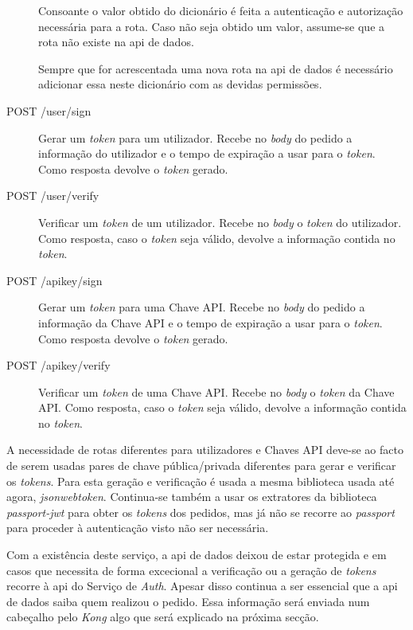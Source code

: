 \begin{description}
        Consoante o valor obtido do dicionário é feita a autenticação e autorização necessária para a rota. Caso não seja obtido um valor, assume-se que a rota não existe na \acrshort{api} de dados.

        Sempre que for acrescentada uma nova rota na \acrshort{api} de dados é necessário adicionar essa neste dicionário com as devidas permissões.
    \item[POST /user/sign] Gerar um \textit{token} para um utilizador. Recebe no \textit{body} do pedido a informação do utilizador e o tempo de expiração a usar para o \textit{token}. Como resposta devolve o \textit{token} gerado.
    \item[POST /user/verify] Verificar um \textit{token} de um utilizador. Recebe no \textit{body} o \textit{token} do utilizador. Como resposta, caso o \textit{token} seja válido, devolve a informação contida no \textit{token}.
    \item[POST /apikey/sign] Gerar um \textit{token} para uma Chave API. Recebe no \textit{body} do pedido a informação da Chave API e o tempo de expiração a usar para o \textit{token}. Como resposta devolve o \textit{token} gerado.
    \item[POST /apikey/verify] Verificar um \textit{token} de uma Chave API. Recebe no \textit{body} o \textit{token} da Chave API. Como resposta, caso o \textit{token} seja válido, devolve a informação contida no \textit{token}.
\end{description}

A necessidade de rotas diferentes para utilizadores e Chaves API deve-se ao facto de serem usadas pares de chave pública/privada diferentes para gerar e verificar os \textit{tokens}. Para esta geração e verificação é usada a mesma biblioteca usada até agora, \textit{jsonwebtoken}. Continua-se também a usar os extratores da biblioteca \textit{passport-jwt} para obter os \textit{tokens} dos pedidos, mas já não se recorre ao \textit{passport} para proceder à autenticação visto não ser necessária.

Com a existência deste serviço, a \acrshort{api} de dados deixou de estar protegida e em casos que necessita de forma excecional a verificação ou a geração de \textit{tokens} recorre à \acrshort{api} do Serviço de \textit{Auth}. Apesar disso continua a ser essencial que a \acrshort{api} de dados saiba quem realizou o pedido. Essa informação será enviada num cabeçalho pelo \textit{Kong} algo que será explicado na próxima secção.

